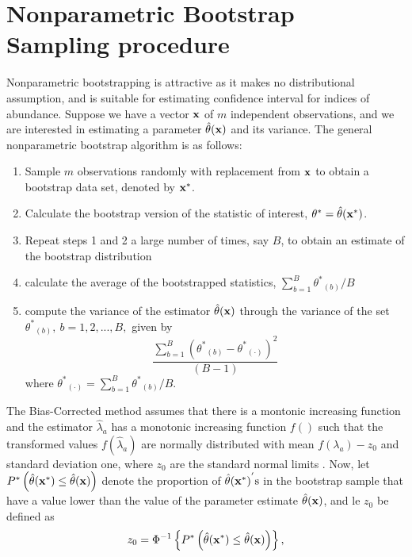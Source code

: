 \documentclass[a4paper 12pt]{article}
\numberwithin{equation}{section}
\begin{document}
\section{\large Nonparametric Bootstrap Sampling procedure}
\label{secAP:nonparametricbootstrap}
Nonparametric bootstrapping is attractive as it makes no distributional assumption, and is suitable for estimating confidence interval for indices of abundance. Suppose we have a vector $\bf x$ of $m$ independent observations, and we are interested in estimating a parameter $\hat{\theta} ({\bf x})$ and its variance. The general nonparametric bootstrap algorithm is as follows:
\begin{enumerate}
\item Sample $m$ observations randomly with replacement from ${\bf x}$ to obtain a bootstrap data set, denoted by ${\bf {x}^{*}}$.
\item Calculate the bootstrap version of the statistic of interest, ${\theta}^{*} = \hat{\theta}({\bf {x}^{*}})$.
\item Repeat steps 1 and 2 a large number of times, say $B$, to obtain an estimate of the bootstrap distribution
\item calculate the average of the bootstrapped statistics, $\sum_{b=1}^{B} {{\theta}^{*}}_{(b)}/B$ 
\item compute the variance of the estimator $\hat{\theta}({\bf x})$ through the variance of the set ${{\theta}^{*}}_{(b)}, \ b = 1,2,...,B,$ given by 
\begin{equation}
\frac{ \sum_{b=1}^{B} {\left({{\theta}^{*}}_{(b)} - {{\theta}^{*}}_{(\cdot)} \right)}^{2}  }{(B-1)} 
\end{equation}
where ${{\theta}^{*}}_{(\cdot)} = \sum_{b=1}^{B} {{\theta}^{*}}_{(b)}/B. $
\end{enumerate}
The Bias-Corrected method assumes that there is a montonic increasing function and the estimator $\hat{\lambda}_{a}$ has a monotonic increasing function $f()$ such that the transformed values $f(\hat{\lambda}_{a})$ are normally distributed with mean $f(\lambda_{a}) - z_{0}$ and standard deviation one, where $z_{0}$ are the standard normal limits \citep{puth2015variety, karlsson2009bootstrap}. Now, let $P^{*} \left(\hat{\theta} ({\bf x^{*}}) \leq \hat{\theta} ({\bf x}) \right) $ denote the proportion of $\hat{\theta} {({\bf x^{*}})}^{'} \mathrm{s}$ in the bootstrap sample that have a value lower than the value of the parameter estimate $\hat{\theta} ({\bf x})$, and le $z_{0}$ be defined as
\begin{equation}
 z_{0} = \Phi^{-1} \left\{ P^{*} \left(\hat{\theta} ({\bf x^{*}}) \leq \hat{\theta} ({\bf x}) \right) \right\}, 
\end{equation}
\end{document}
